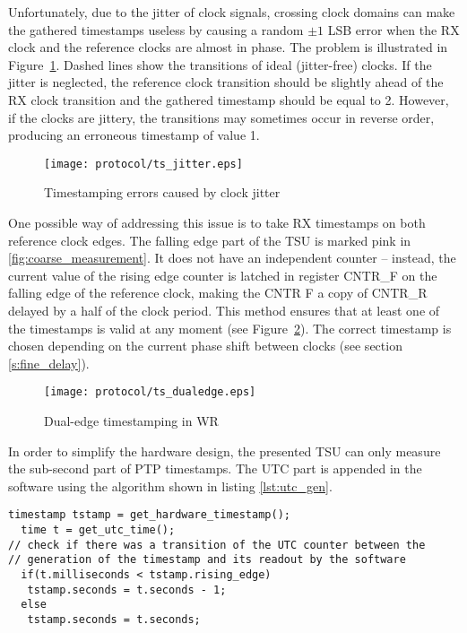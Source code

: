 Unfortunately, due to the jitter of clock signals, crossing clock domains
can make the gathered timestamps useless by causing a random $\pm 1$ LSB
error when the RX clock and the reference clocks are almost in phase. The
problem is illustrated in Figure~\ref{fig:ts_jitter}.  Dashed lines show
the transitions of ideal (jitter-free) clocks. If the jitter is neglected,
the reference clock transition should be slightly ahead of the RX clock
transition and the gathered timestamp should be equal to 2. However, if the
clocks are jittery, the transitions may sometimes occur in reverse order,
producing an erroneous timestamp of value 1.
\begin{figure}[ht!]
  \centering
  \texttt{[image: protocol/ts\_jitter.eps]}
  \caption{Timestamping errors caused by clock jitter}
  \label{fig:ts_jitter}
\end{figure}
One possible way of addressing this issue is to take RX timestamps on both
reference clock edges. The falling edge part of the TSU is marked pink in
\ref{fig:coarse_measurement}. It does not have an independent counter --
instead, the current value of the rising edge counter is latched in register
CNTR\_F on the falling edge of the reference clock, making the CNTR\us
F a copy of CNTR\_R delayed by a half of the clock period. This method
ensures that at least one of the timestamps is valid at any moment 
(see Figure~\ref{fig:ts_dualedge}). The correct timestamp is chosen depending on the
current phase shift between clocks (see section \ref{s:fine_delay}).
\begin{figure}[ht!]
  \centering
  \texttt{[image: protocol/ts\_dualedge.eps]}
  \caption{Dual-edge timestamping in WR}
  \label{fig:ts_dualedge}
\end{figure}
In order to simplify the hardware design, the presented TSU can only measure
the sub-second part of PTP timestamps. The UTC part is appended in the
software using the algorithm shown in listing \ref{lst:utc_gen}.
\begin{lstlisting}[caption=Producing UTC timestamps,label=lst:utc_gen]
  timestamp tstamp = get_hardware_timestamp();
  time t = get_utc_time();
// check if there was a transition of the UTC counter between the
// generation of the timestamp and its readout by the software
  if(t.milliseconds < tstamp.rising_edge)
   tstamp.seconds = t.seconds - 1;
  else
   tstamp.seconds = t.seconds;
\end{lstlisting}



